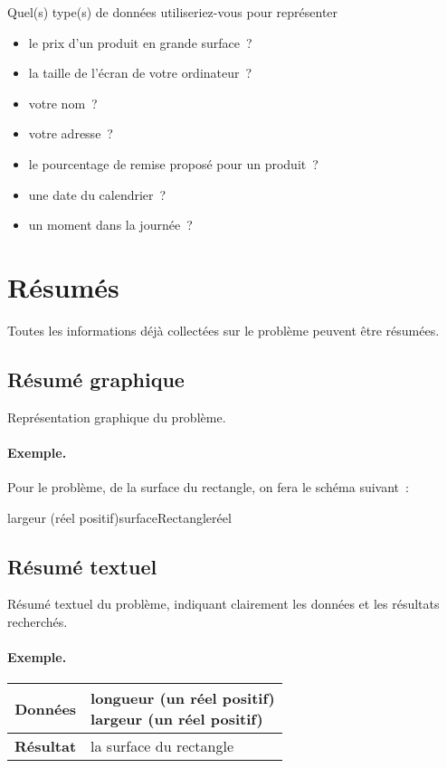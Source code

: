 			Quel(s) type(s) de données utiliseriez-vous pour représenter 
			\begin{itemize}
				\item le prix d’un produit en grande surface~?
				\item la taille de l’écran de votre ordinateur~?
				\item votre nom~?
				\item votre adresse~?
				\item le pourcentage de remise proposé pour un produit~?
				\item une date du calendrier~?
				\item un moment dans la journée~?
			\end{itemize}
			
	\section{Résumés}
	
		Toutes les informations déjà collectées sur le problème
		peuvent être résumées. 
		
		\subsection{Résumé graphique}
		
		Représentation graphique du problème.
	
		\begin{Emphase}
			\paragraph{Exemple.}
			Pour le problème, de la surface du rectangle, 
			on fera le schéma suivant~:
			
			\center{}
			{largeur (réel positif)}{surfaceRectangle}{réel}	
		\end{Emphase}

		\subsection{Résumé textuel}

		Résumé textuel du problème, indiquant clairement les données et les 
		résultats recherchés. 

		\begin{Emphase}
			\paragraph{Exemple.}
			\begin{tabular}[t]{|>{\columncolor{black!40}}r|l|}
				\hline
				\textbf{Données} & \makecell[tl]{
					longueur (un réel positif)\\
					largeur (un réel positif)
				}\\
				\hline
				\textbf{Résultat} & la surface du rectangle\\
				\hline
			\end{tabular}
		\end{Emphase}
		
